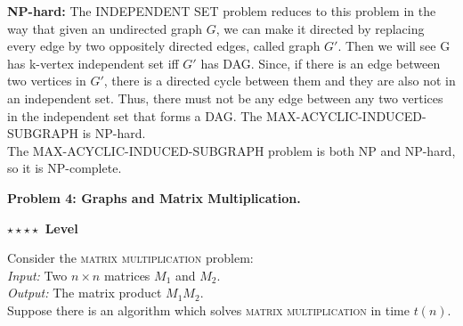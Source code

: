 \documentclass{article}\usepackage[utf8]{inputenc}\usepackage[margin=0.4cm,top=0.4cm,bottom=0.4cm]{geometry}\usepackage[usenames,dvipsnames,svgnames,table]{xcolor}
\newcommand\tab[1][1cm]{\hspace*{#1}}
\begin{document}
\begin{enumerate}[1.]
\textbf{NP-hard:} The INDEPENDENT SET problem reduces to this problem in the way that given an undirected graph $G$, we can make it directed by replacing every edge by two oppositely directed edges, called graph $G'$. Then we will see G has k-vertex independent set iff $G'$ has DAG. Since, if there is an edge between two vertices in $G'$, there is a directed cycle between them and they are also not in an independent set. Thus, there must not be any edge between any two vertices in the independent set that forms a DAG. The MAX-ACYCLIC-INDUCED-SUBGRAPH is NP-hard.\\
The MAX-ACYCLIC-INDUCED-SUBGRAPH problem is both NP and NP-hard, so it is NP-complete.
\EndSolution
\end{enumerate}
\clearpage

\vspace{-2mm}\noindent\begin{mybox}{\begin{center}\textbf{\color{black}Problem 4: Graphs and Matrix Multiplication.}\end{center}}\end{mybox}\vspace{-2mm}
\begin{myboxot}\noindent\textbf{$\star\star\star\star$ Level}\end{myboxot} 

\noindent Consider the \textsc{matrix multiplication} problem:\\

\noindent \tab \textit{Input:} Two $n\times n$ matrices $M_1$ and $M_2$.\\
\tab \textit{Output:} The matrix product $M_1M_2$.\\

\noindent Suppose there is an algorithm which solves \textsc{matrix multiplication} in time $t(n)$.
\end{document}
